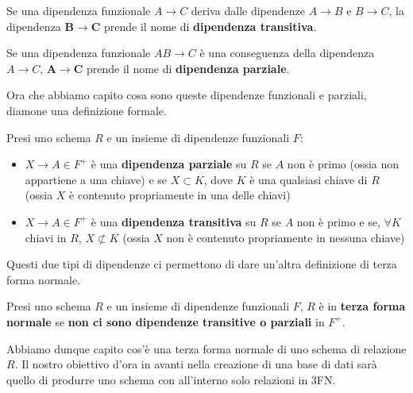 \documentclass[11pt, a4paper, titlepage, oneside]{scrbook}
\begin{document}
\begin{Definizione}
\label{def-dipendenza-transitiva}
Se una dipendenza funzionale $A\longrightarrow C$ deriva dalle dipendenze $A \longrightarrow B$ e $B \longrightarrow C$, la dipendenza $\bm{B} \longrightarrow \bm{C}$ prende il nome di \textbf{dipendenza transitiva}.
\end{Definizione}

\begin{Definizione}
\label{def-dipendenza-parziale}
Se una dipendenza funzionale $AB \longrightarrow C$ è una conseguenza della dipendenza $A \longrightarrow C$, $\bm{A} \longrightarrow \bm{C}$ prende il nome di \textbf{dipendenza parziale}.
\end{Definizione}

Ora che abbiamo capito cosa sono queste dipendenze funzionali e parziali, diamone una definizione formale.

\begin{Definizione}
\label{def-dipendenza-parziale-transitiva-formale}
Presi uno schema $R$ e un insieme di dipendenze funzionali $F$:
\begin{itemize}
    \item $X \longrightarrow A \in F^+$ è una \textbf{dipendenza parziale} su $R$ se $A$ non è primo (ossia non appartiene a una chiave) e se $X \subset K$, dove $K$ è una qualsiasi chiave di $R$ (ossia $X$ è contenuto propriamente in una delle chiavi)
    \item $X \longrightarrow A \in F^+$ è una \textbf{dipendenza transitiva} su $R$ se $A$ non è primo e se, $\forall K$ chiavi in $R$, $X \nsubset K$ (ossia $X$ non è contenuto propriamente in nessuna chiave)
\end{itemize}
\end{Definizione}

Questi due tipi di dipendenze ci permettono di dare un'altra definizione di terza forma normale.

\begin{Definizione}
\label{def-terza-forma-normale-2}
Presi uno schema $R$ e un insieme di dipendenze funzionali $F$, $R$ è in \textbf{terza forma normale} se \textbf{non ci sono dipendenze transitive o parziali} in $F^+$.
\end{Definizione}

Abbiamo dunque capito cos'è una terza forma normale di uno schema di relazione $R$. Il nostro obiettivo d'ora in avanti nella creazione di una base di dati sarà quello di produrre uno schema con all'interno solo relazioni in 3FN. 
\end{document}
